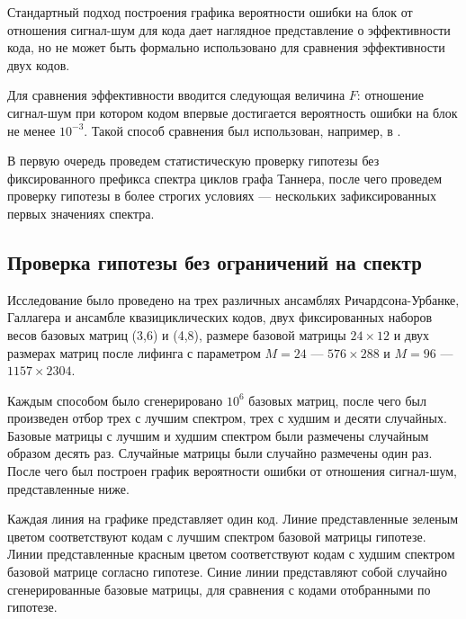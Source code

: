 Стандартный подход построения графика вероятности ошибки на блок от отношения
сигнал-шум для кода дает наглядное представление о эффективности кода, но не может быть формально использовано
для сравнения эффективности двух кодов.

Для сравнения эффективности вводится следующая величина $F$: отношение сигнал-шум при котором кодом
впервые достигается вероятность ошибки на блок не менее $10^{-3}$. Такой способ сравнения был использован,
например, в \cite{kudryashov-huawei}.

В первую очередь проведем статистическую проверку гипотезы без фиксированного префикса спектра циклов
графа Таннера, после чего проведем проверку гипотезы в более строгих условиях --- нескольких зафиксированных
первых значениях спектра.

\newcommand{\plotstandard}[2]{
\centerline{\texttt{[image: \#1]}}
\captionof{figure}{#2}
}

\newcommand{\plotsmall}[1]{\texttt{[image: \#1]}}

\subsection{Проверка гипотезы без ограничений на спектр}

Исследование было проведено на трех различных ансамблях Ричардсона-Урбанке, Галлагера и ансамбле
квазициклических кодов, двух фиксированных наборов весов базовых матриц (3,6) и (4,8), размере
базовой матрицы $24 \times 12$ и двух размерах матриц после лифинга с параметром $M=24$ --- $576 \times 288$
и $M=96$ --- $1157 \times 2304$.

Каждым способом было сгенерировано $10^6$ базовых матриц, после чего был произведен отбор трех с лучшим
спектром, трех с худшим и десяти случайных. Базовые матрицы с лучшим и худшим спектром были размечены
случайным образом десять раз. Случайные матрицы были случайно размечены один раз. После чего был
построен график вероятности ошибки от отношения сигнал-шум, представленные ниже.

Каждая линия на графике представляет один код. Линие представленные зеленым цветом соответствуют
кодам с лучшим спектром базовой матрицы гипотезе. Линии представленные красным цветом соответствуют кодам с
худшим спектром базовой матрице согласно гипотезе. Синие линии представляют собой случайно сгенерированные
базовые матрицы, для сравнения с кодами отобранными по гипотезе.

